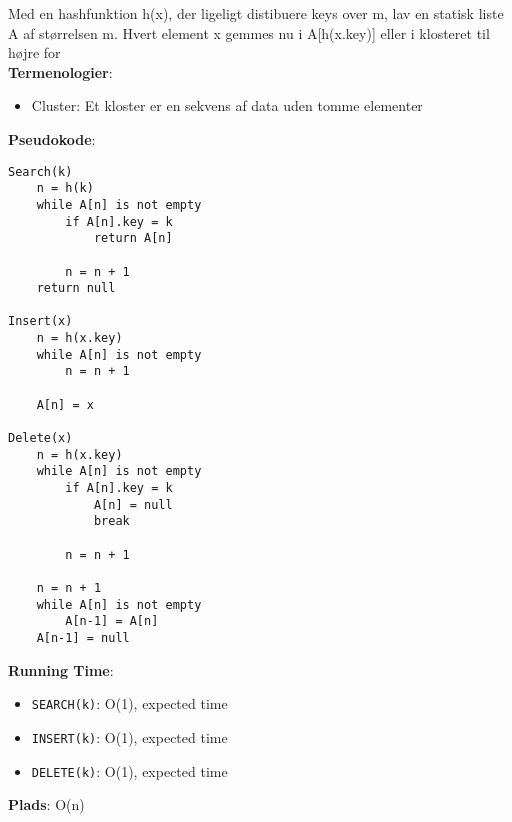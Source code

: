 Med en hashfunktion h(x), der ligeligt distibuere keys over m, lav en statisk liste A af størrelsen m. Hvert element x gemmes nu i A[h(x.key)] eller i klosteret til højre for\\
\textbf{Termenologier}:
\begin{itemize}
	\item Cluster: Et kloster er en sekvens af data uden tomme elementer
\end{itemize}
\textbf{Pseudokode}:
\begin{lstlisting}[frame=single, mathescape=true]
Search(k)
	n = h(k)
	while A[n] is not empty
		if A[n].key = k
			return A[n]
		
		n = n + 1
	return null

Insert(x)
	n = h(x.key)
	while A[n] is not empty
		n = n + 1
	
	A[n] = x

Delete(x)
	n = h(x.key)
	while A[n] is not empty
		if A[n].key = k
			A[n] = null
			break
		
		n = n + 1

	n = n + 1
	while A[n] is not empty
		A[n-1] = A[n]
	A[n-1] = null
\end{lstlisting}
\textbf{Running Time}:
\begin{itemize}
	\item \texttt{SEARCH(k)}: O(1), expected time
	\item \texttt{INSERT(k)}: O(1), expected time
	\item \texttt{DELETE(k)}: O(1), expected time
\end{itemize}
\textbf{Plads}: O(n)